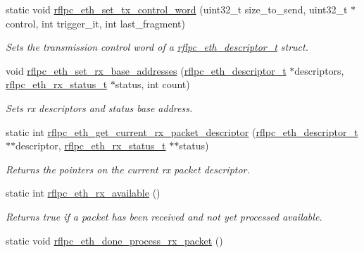 \begin{DoxyCompactItemize}
static void \hyperlink{group__eth_gad8f2bfd64ec7401b1d19df89bd34ecfb}{rflpc\-\_\-eth\-\_\-set\-\_\-tx\-\_\-control\-\_\-word} (uint32\-\_\-t size\-\_\-to\-\_\-send, uint32\-\_\-t $\ast$control, int trigger\-\_\-it, int last\-\_\-fragment)
\begin{DoxyCompactList}\small\item\em Sets the transmission control word of a \hyperlink{structrflpc__eth__descriptor__t}{rflpc\-\_\-eth\-\_\-descriptor\-\_\-t} struct. \end{DoxyCompactList}\item 
void \hyperlink{group__eth_ga47f9acbab027c73f5f672caeb8343871}{rflpc\-\_\-eth\-\_\-set\-\_\-rx\-\_\-base\-\_\-addresses} (\hyperlink{structrflpc__eth__descriptor__t}{rflpc\-\_\-eth\-\_\-descriptor\-\_\-t} $\ast$descriptors, \hyperlink{structrflpc__eth__rx__status__t}{rflpc\-\_\-eth\-\_\-rx\-\_\-status\-\_\-t} $\ast$status, int count)
\begin{DoxyCompactList}\small\item\em Sets rx descriptors and status base address. \end{DoxyCompactList}\item 
static int \hyperlink{group__eth_ga06310dadd40007da79da7f434816f64c}{rflpc\-\_\-eth\-\_\-get\-\_\-current\-\_\-rx\-\_\-packet\-\_\-descriptor} (\hyperlink{structrflpc__eth__descriptor__t}{rflpc\-\_\-eth\-\_\-descriptor\-\_\-t} $\ast$$\ast$descriptor, \hyperlink{structrflpc__eth__rx__status__t}{rflpc\-\_\-eth\-\_\-rx\-\_\-status\-\_\-t} $\ast$$\ast$status)
\begin{DoxyCompactList}\small\item\em Returns the pointers on the current rx packet descriptor. \end{DoxyCompactList}\item 
static int \hyperlink{group__eth_gaf6fea7f08b38dcb9c9ef267f910989ac}{rflpc\-\_\-eth\-\_\-rx\-\_\-available} ()
\begin{DoxyCompactList}\small\item\em Returns true if a packet has been received and not yet processed available. \end{DoxyCompactList}\item 
\hypertarget{group__eth_gadf32019c43a12949903ce47e078d2b4e}{static void \hyperlink{group__eth_gadf32019c43a12949903ce47e078d2b4e}{rflpc\-\_\-eth\-\_\-done\-\_\-process\-\_\-rx\-\_\-packet} ()}\label{group__eth_gadf32019c43a12949903ce47e078d2b4e}


\end{DoxyCompactItemize}
